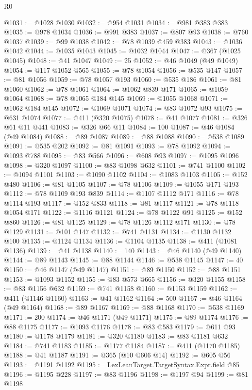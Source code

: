 \begin{lexlean}{R0}
\begin{coremodule}
@1031 := @1028 @1030
@1032 := @954 @1031
@1034 := @981 @383 @383
@1035 := @978 @1034
@1036 := @991 @383
@1037 := @807 @93
@1038 := @760 @1037
@1039 := @99 @1038
@1042 := @78 @1039 @459 @383
@1043 := @1036 @1042
@1044 := @1035 @1043
@1045 := @1032 @1044
@1047 := @367 (@1025 @1045)
@1048 := @41 @1047
@1049 := 25
@1052 := @46 @1049 (@49 @1049)
@1054 := @117 @1052 @565
@1055 := @78 @1054
@1056 := @535 @147
@1057 := @81 @1056
@1059 := @78 @1057 @193
@1060 := @535 @186
@1061 := @81 @1060
@1062 := @78 @1061
@1064 := @1062 @839 @171
@1065 := @1059 @1064
@1068 := @78 @1065 @184 @145
@1069 := @1055 @1068
@1071 := @1062 @184 @145
@1072 := @1069 @1071
@1074 := @83 @1072 @93
@1075 := @631 @1074
@1077 := @411 (@320 @1075)
@1078 := @41 @1077
@1081 := @326 @61 @11 @441
@1083 := @326 @66 @11
@1084 := 100
@1087 := @46 @1084 (@49 @1084)
@1088 := @89 @1087
@1089 := @88 @1088
@1090 := @538 @1089
@1091 := @535 @202
@1092 := @81 @1091
@1093 := @78 @1092
@1094 := @1093 @788
@1095 := @83 @566
@1096 := @608 @93
@1097 := @1095 @1096
@1098 := @320 @1097
@1100 := @83 @1098 @632
@1101 := @741 @1100
@1102 := @1094 @1101
@1103 := @1090 @1102
@1104 := @1083 @1103
@1105 := @152 @480
@1106 := @81 @1105
@1107 := @78 @1106
@1109 := @1055 @171 @193
@1112 := @78 @1109 @193 @839
@1114 := @1107 @1112 @171
@1116 := @78 @1114 @193
@1117 := @152 @833
@1118 := @81 @1117
@1121 := @78 @1118 @1054 @171
@1122 := @1116 @1121
@1124 := @78 @1122 @91
@1125 := @152 @860
@1126 := @81 @1125
@1129 := @78 @1126 @1112 @171
@1130 := @78 @1129
@1131 := @101 @147
@1132 := @741 @1131
@1134 := @1130 @1132 @100
@1135 := @1124 @1134
@1136 := @1104 @1135
@1138 := @411 (@1081 @1136)
@1139 := @41 @1138
@1140 := 140
@1143 := @46 @1140 (@49 @1140)
@1144 := @89 @1143
@1145 := @88 @1144
@1146 := @538 @1145
@1147 := 40
@1150 := @46 @1147 (@49 @1147)
@1151 := @89 @1150
@1152 := @88 @1151
@1153 := @1093 @1152
@1155 := @83 @573 @665
@1156 := @320 @1155
@1158 := @83 @1156 @632
@1159 := @741 @1158
@1160 := @1153 @1159
@1162 := @411 (@1146 @1160)
@1163 := @41 @1162
@1164 := 500
@1167 := @46 @1164 (@49 @1164)
@1168 := @89 @1167
@1169 := @88 @1168
@1170 := @538 @1169
@1171 := 200
@1174 := @46 @1171 (@49 @1171)
@1175 := @89 @1174
@1176 := @88 @1175
@1177 := @1093 @1176
@1178 := @83 @583
@1179 := @611 @93
@1180 := @1178 @1179
@1181 := @320 @1180
@1183 := @83 @1181 @632
@1184 := @741 @1183
@1185 := @1177 @1184
@1187 := @411 (@1170 @1185)
@1188 := @41 @1187
@1191 := @365 (@10 @606 @14)
@1192 := @605 @56
@1193 := @1191 @1192
@1195 := LexLeanTarget.TargetSyntax.Expr.field @85
@1196 := @1195 @228
@1197 := @83 @1196
@1198 := @1197 @94
@1199 := @81 @1198

\end{coremodule}
\end{lexlean}
